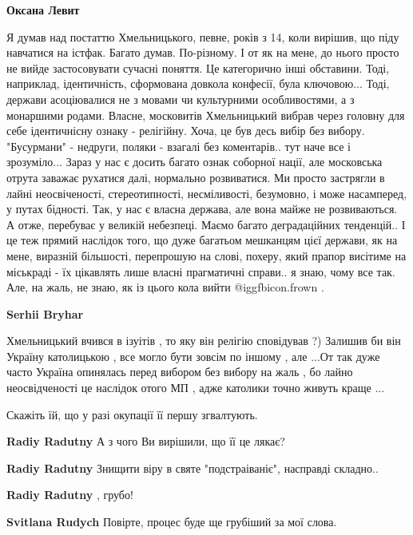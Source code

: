 \begin{itemize}
\begin{itemize}
\textbf{Оксана Левит} 

Я думав над постаттю Хмельницького, певне, років з 14, коли вирішив, що піду
навчатися на істфак. Багато думав. По-різному. І от як на мене, до нього просто
не вийде застосовувати сучасні поняття. Це категорично інші обставини. Тоді,
наприклад, ідентичність, сформована довкола конфесії, була ключовою... Тоді,
держави асоціювалися не з мовами чи культурними особливостями, а з монаршими
родами. Власне, московитів Хмельницький вибрав через головну для себе
ідентичнісну ознаку - релігійну. Хоча, це був десь вибір без вибору.
"Бусурмани" - недруги, поляки - взагалі без коментарів.. тут наче все і
зрозуміло... Зараз у нас є досить багато ознак соборної нації, але московська
отрута заважає рухатися далі, нормально розвиватися. Ми просто застрягли в
лайні неосвіченості, стереотипності, несміливості, безумовно, і може
насамперед, у путах бідності. Так, у нас є власна держава, але вона майже не
розвиваються. А отже, перебуває у великій небезпеці. Маємо багато деградаційних
тенденцій.. І це теж прямий наслідок того, що дуже багатьом мешканцям цієї
держави, як на мене, виразній більшості, перепрошую на слові, похеру, який
прапор висітиме на міськраді - їх цікавлять лише власні прагматичні справи.. я
знаю, чому все так. Але, на жаль, не знаю, як із цього кола вийти  @igg{fbicon.frown} .

\textbf{Serhii Bryhar} 

Хмельницький вчився в ізуітів , то яку він релігію сповідував ?) Залишив би він
Україну католицькою , все могло бути зовсім по іншому , але ...От так дуже
часто Україна опинялась перед вибором без вибору на жаль , бо лайно
неосвідченості це наслідок отого МП , адже католики точно живуть краще ...

\end{itemize} %

Скажіть їй, що у разі окупації її першу згвалтують.

\begin{itemize} %
\textbf{Radiy Radutny} А з чого Ви вирішили, що її це лякає?


\textbf{Radiy Radutny} Знищити віру в святе "подстраіваніє", насправді складно..

\textbf{Radiy Radutny} , грубо!

\textbf{Svitlana Rudych} Повірте, процес буде ще грубіший за мої слова.


\end{itemize}
\end{itemize}
